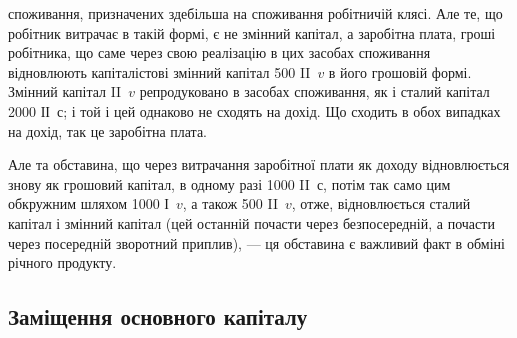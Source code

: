 \parcont{}  %
споживання, призначених здебільша на споживання робітничій клясі.
Але те, що робітник витрачає в такій формі, є не змінний капітал, а
заробітна плата, гроші робітника, що саме через свою реалізацію в цих
засобах споживання відновлюють капіталістові змінний капітал 500 II~$v$
в його грошовій формі. Змінний капітал II~$v$ репродуковано в засобах
споживання, як і сталий капітал 2000 ІІ~$с$; і той і цей однаково не
сходять на дохід. Що сходить в обох випадках на дохід, так це заробітна
плата.

Але та обставина, що через витрачання заробітної плати як доходу
відновлюється знову як грошовий капітал, в одному разі 1000 II~$с$,
потім так само цим обкружним шляхом 1000 І~$v$, а також 500 II~$v$,
отже, відновлюється сталий капітал і змінний капітал (цей останній
почасти через безпосередній, а почасти через посередній зворотний приплив),
— ця обставина є важливий факт в обміні річного продукту.

\subsection{Заміщення основного капіталу}

